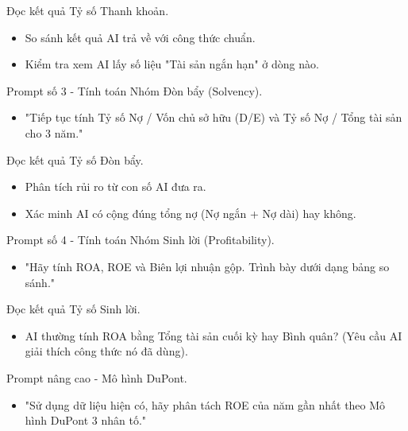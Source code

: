 \documentclass[aspectratio=169]{beamer}
\begin{document}
\begin{frame}{Đọc kết quả Tỷ số Thanh khoản.}
    \begin{itemize}
        \item So sánh kết quả AI trả về với công thức chuẩn.
        \item Kiểm tra xem AI lấy số liệu "Tài sản ngắn hạn" ở dòng nào.
    \end{itemize}
\end{frame}


\begin{frame}{Prompt số 3 - Tính toán Nhóm Đòn bẩy (Solvency).}
    \begin{itemize}
        \item "Tiếp tục tính Tỷ số Nợ / Vốn chủ sở hữu (D/E) và Tỷ số Nợ / Tổng tài sản cho 3 năm."
    \end{itemize}
\end{frame}


\begin{frame}{Đọc kết quả Tỷ số Đòn bẩy.}
    \begin{itemize}
        \item Phân tích rủi ro từ con số AI đưa ra.
        \item Xác minh AI có cộng đúng tổng nợ (Nợ ngắn + Nợ dài) hay không.
    \end{itemize}
\end{frame}


\begin{frame}{Prompt số 4 - Tính toán Nhóm Sinh lời (Profitability).}
    \begin{itemize}
        \item "Hãy tính ROA, ROE và Biên lợi nhuận gộp. Trình bày dưới dạng bảng so sánh."
    \end{itemize}
\end{frame}


\begin{frame}{Đọc kết quả Tỷ số Sinh lời.}
    \begin{itemize}
        \item AI thường tính ROA bằng Tổng tài sản cuối kỳ hay Bình quân? (Yêu cầu AI giải thích công thức nó đã dùng).
    \end{itemize}
\end{frame}


\begin{frame}{Prompt nâng cao - Mô hình DuPont.}
    \begin{itemize}
        \item "Sử dụng dữ liệu hiện có, hãy phân tách ROE của năm gần nhất theo Mô hình DuPont 3 nhân tố."
    \end{itemize}
\end{frame}
\end{document}
